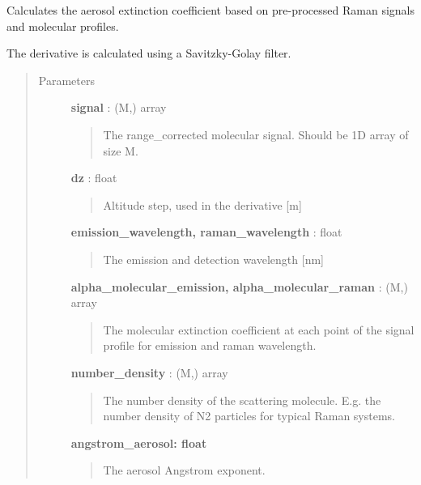 \documentclass[letterpaper,10pt,english]{sphinxmanual}
\begin{document}
\begin{fulllineitems}
\label{raman:raman_retrievals.retrieve_raman_extinction}
Calculates the aerosol extinction coefficient based on pre-processed Raman signals and molecular profiles.

The derivative is calculated using a Savitzky-Golay filter.
\begin{quote}\begin{description}
\item[{Parameters}] \leavevmode
\textbf{signal} : (M,) array
\begin{quote}

The range\_corrected molecular signal. Should be 1D array of size M.
\end{quote}

\textbf{dz} : float
\begin{quote}

Altitude step, used in the derivative {[}m{]}
\end{quote}

\textbf{emission\_wavelength, raman\_wavelength} : float
\begin{quote}

The emission and detection wavelength {[}nm{]}
\end{quote}

\textbf{alpha\_molecular\_emission, alpha\_molecular\_raman} : (M,) array
\begin{quote}

The molecular extinction coefficient at each point of the signal profile for emission and raman wavelength.
\end{quote}

\textbf{number\_density} : (M,) array
\begin{quote}

The number density of the scattering molecule. E.g. the number density of N2 particles for typical Raman systems.
\end{quote}

\textbf{angstrom\_aerosol: float}
\begin{quote}

The aerosol Angstrom exponent.
\end{quote}


\end{description}
\end{quote}
\end{fulllineitems}
\end{document}
